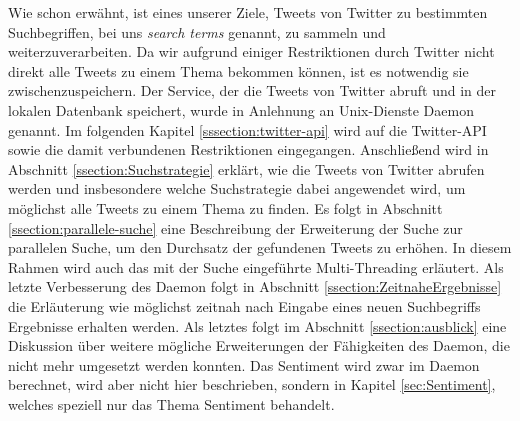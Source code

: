 \label{sec:daemon}
Wie schon erwähnt, ist eines unserer Ziele, Tweets von Twitter zu bestimmten Suchbegriffen, bei uns \textit{search terms} genannt, zu sammeln und weiterzuverarbeiten.
Da wir aufgrund einiger Restriktionen durch Twitter nicht direkt alle Tweets zu einem Thema bekommen können, ist es notwendig sie zwischenzuspeichern.
Der Service, der die Tweets von Twitter abruft und in der lokalen Datenbank speichert, wurde in Anlehnung an Unix-Dienste 
Daemon genannt. 
Im folgenden Kapitel \ref{sssection:twitter-api} wird auf die Twitter-API sowie  die damit verbundenen Restriktionen eingegangen.
Anschließend wird in Abschnitt \ref{ssection:Suchstrategie} erklärt, wie die Tweets von Twitter abrufen  werden und insbesondere welche Suchstrategie dabei angewendet wird, um möglichst alle Tweets zu einem Thema zu finden.
Es folgt in Abschnitt \ref{ssection:parallele-suche} eine Beschreibung der Erweiterung der Suche zur parallelen Suche, um den Durchsatz der gefundenen Tweets zu erhöhen.
In diesem Rahmen wird auch das mit der Suche eingeführte Multi-Threading erläutert.
Als letzte Verbesserung des Daemon folgt in Abschnitt \ref{ssection:ZeitnaheErgebnisse} die Erläuterung wie möglichst zeitnah nach Eingabe eines neuen Suchbegriffs Ergebnisse erhalten werden.
Als letztes folgt im Abschnitt \ref{ssection:ausblick} eine Diskussion über 
weitere mögliche Erweiterungen der Fähigkeiten des Daemon, die nicht mehr umgesetzt werden konnten.
Das Sentiment wird zwar im Daemon berechnet, wird aber nicht hier beschrieben, sondern in Kapitel \ref{sec:Sentiment}, welches speziell nur das Thema Sentiment behandelt.

